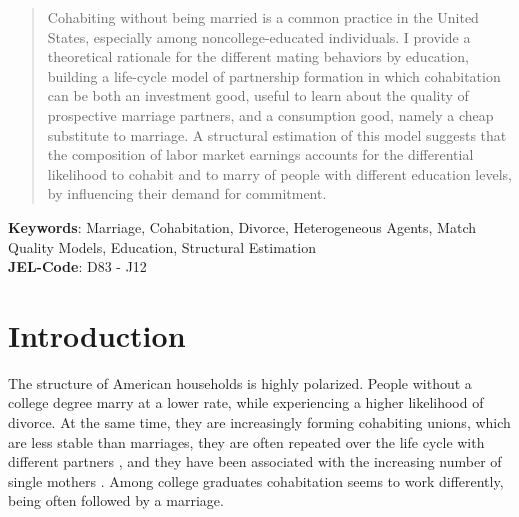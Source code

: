\documentclass[12pt]{article}
\begin{document}

\begin{abstract}
	Cohabiting without being married is a common practice in the United States, especially among noncollege-educated individuals. I provide a theoretical rationale for the different mating behaviors by education, building a life-cycle model of partnership formation in which cohabitation can be both an investment good, useful to learn about the quality of prospective marriage partners, and a consumption good, namely a cheap substitute to marriage. A structural estimation of this model suggests that the composition of labor market earnings accounts for the differential likelihood to cohabit and to marry of people with different education levels, by influencing their demand for commitment.
\end{abstract}


\textbf{Keywords}: Marriage, Cohabitation, Divorce, Heterogeneous Agents, Match Quality Models, Education, Structural Estimation\\
\textbf{JEL-Code}: D83 - J12 
\clearpage
\section{Introduction}

The structure of American households is highly polarized. People without a college degree marry at a lower rate, while experiencing a higher likelihood of divorce. At the same time, they are increasingly forming cohabiting unions, which are less stable than marriages, they are often repeated over the life cycle with different partners \citep{lichter2010}, and they have been associated with the increasing number of single mothers \citep{bumpass2000}. Among college graduates cohabitation seems to work differently, being often followed by a marriage.
\end{document}
